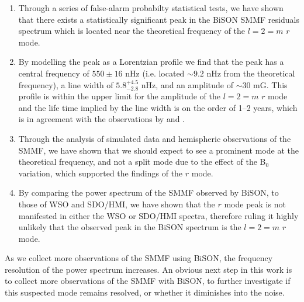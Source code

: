 \begin{enumerate}
	\item{Through a series of false-alarm probabilty statistical tests, we have shown that there exists a statistically significant peak in the BiSON SMMF residuals spectrum which is located near the theoretical frequency of the $l=2=m$ $r$ mode.}
	
	\item{By modelling the peak as a Lorentzian profile we find that the peak has a central frequency of $550 \pm 16$ nHz (i.e. located $\sim 9.2$ nHz from the theoretical frequency), a line width of $5.8^{+4.5}_{-2.8}$ nHz, and an amplitude of $\sim 30$ mG. This profile is within the upper limit for the amplitude of the $l=2=m$ $r$ mode and the life time implied by the line width is on the order of 1--2 years, which is in agreement with the observations by \citet{loptien_global-scale_2018} and \citet{liang_time-distance_2019}.}
	
	\item{Through the analysis of simulated data and hemispheric observations of the SMMF, we have shown that we should expect to see a prominent mode at the theoretical frequency, and not a split mode due to the effect of the B$_0$ variation, which supported the findings of the $r$ mode.}
	
	\item{By comparing the power spectrum of the SMMF observed by BiSON, to those of WSO and SDO/HMI, we have shown that the $r$ mode peak is not manifested in either the WSO or SDO/HMI spectra, therefore ruling it highly unlikely that the observed peak in the BiSON spectrum is the $l=2=m$ $r$ mode.}
\end{enumerate}


As we collect more observations of the SMMF using BiSON, the frequency resolution of the power spectrum increases. An obvious next step in this work is to collect more observations of the SMMF with BiSON, to further investigate if this suspected mode remains resolved, or whether it diminishes into the noise.